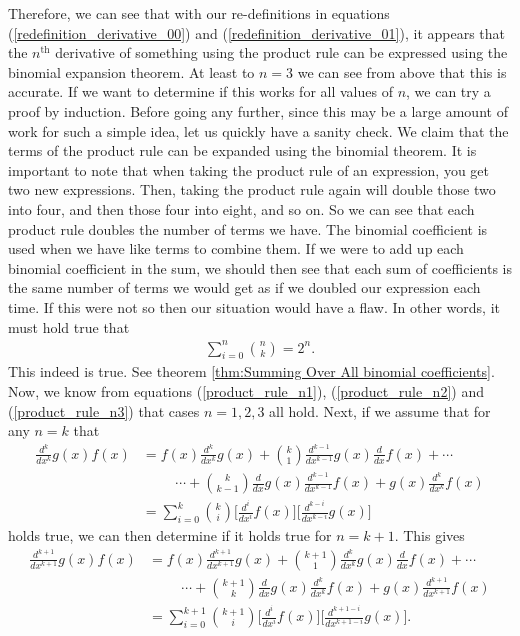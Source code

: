 Therefore, we can see that with our re-definitions in equations (\ref{redefinition_derivative_00}) and (\ref{redefinition_derivative_01}), it appears that the $n^{\textrm{th}}$ derivative of something using the product rule can be expressed using the binomial expansion theorem. At least to $n=3$ we can see from above that this is accurate. If we want to determine if this works for all values of $n$, we can try a proof by induction. Before going any further, since this may be a large amount of work for such a simple idea, let us quickly have a sanity check. We claim that the terms of the product rule can be expanded using the binomial theorem. It is important to note that when taking the product rule of an expression, you get two new expressions. Then, taking the product rule again will double those two into four, and then those four into eight, and so on. So we can see that each product rule doubles the number of terms we have. The binomial coefficient is used when we have like terms to combine them. If we were to add up each binomial coefficient in the sum, we should then see that each sum of coefficients is the same number of terms we would get as if we doubled our expression each time. If this were not so then our situation would have a flaw. In other words, it must hold true that
\begin{align}
	\sum_{i=0}^{n}{{n}\choose{k}} = 2^n.
\end{align}
This indeed is true. See theorem \ref{thm:Summing Over All binomial coefficients}. Now, we know from equations (\ref{product_rule_n1}), (\ref{product_rule_n2}) and (\ref{product_rule_n3}) that cases $n=1,2,3$ all hold. Next, if we assume that for any $n=k$ that
\begin{align}
	\frac{d^k}{dx^k}g(x)f(x)&=f(x)\frac{d^k}{dx^k}g(x)+{{k}\choose{1}}\frac{d^{k-1}}{dx^{k-1}}g(x)\frac{d}{dx}f(x)+\cdots \nonumber\\
	&\hspace{1cm}\cdots+{{k}\choose{k-1}}\frac{d}{dx}g(x)\frac{d^{k-1}}{dx^{k-1}}f(x)+g(x)\frac{d^k}{dx^k}f(x) \\
	&=\sum_{i=0}^{k}{{k}\choose{i}}\bigg[\frac{d^i}{dx^i}f(x) \bigg]\bigg[\frac{d^{k-i}}{dx^{k-i}}g(x) \bigg] \label{repeating_product_rule_final_k}
\end{align}
holds true, we can then determine if it holds true for $n=k+1$. This gives
\begin{align}
	\frac{d^{k+1}}{dx^{k+1}}g(x)f(x)&=f(x)\frac{d^{k+1}}{dx^{k+1}}g(x)+{{{k+1}}\choose{1}}\frac{d^{k}}{dx^{k}}g(x)\frac{d}{dx}f(x)+\cdots \nonumber\\
	&\hspace{1cm}\cdots+{{k+1}\choose{k}}\frac{d}{dx}g(x)\frac{d^{k}}{dx^{k}}f(x)+g(x)\frac{d^{k+1}}{dx^{k+1}}f(x) \\
	&=\sum_{i=0}^{k+1}{{k+1}\choose{i}}\bigg[\frac{d^i}{dx^i}f(x) \bigg]\bigg[\frac{d^{k+1-i}}{dx^{k+1-i}}g(x) \bigg].
\end{align}
